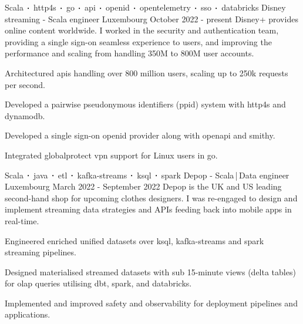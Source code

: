 
\newcommand*{\logo}[2]{\raisebox{-0.2em}{\texttt{[image: \#2]}}\hspace{0.25em}#1}
\newcommand*{\logoonly}[1]{\raisebox{-0.2em}{\texttt{[image: \#1]}}}

\begin{cventries}
    \cventry
    {Scala$\sqbig$http4s$\sqbig$go$\sqbig$api$\sqbig$openid$\sqbig$opentelemetry$\sqbig$sso$\sqbig$databricks}
    {\logo{Disney streaming}{../../../images/disney.png} - Scala engineer}
    {Luxembourg}
    {October 2022 - present}
    {Disney+ provides online content worldwide. I worked in the security and authentication team, providing a single sign-on seamless experience to users, and improving the performance and scaling from handling 350M to 800M user accounts.}
    {
        \begin{cvitems}
            \item{Architectured apis handling over 800 million users, scaling up to 250k requests per second.}
            \item{Developed a pairwise pseudonymous identifiers (ppid) system with http4s and dynamodb.}
            \item{Developed a single sign-on openid provider along with openapi and smithy.}
            \item{Integrated globalprotect vpn support for Linux users in go.}
        \end{cvitems}
    }

    \cventry
    {Scala$\sqbig$java$\sqbig$etl$\sqbig$kafka-streams$\sqbig$ksql$\sqbig$spark}
    {\logo{Depop}{../../../images/depop.jpg} - Scala\,|\,Data engineer}
    {Luxembourg}
    {March 2022 - September 2022}
    {Depop is the UK and US leading second-hand shop for upcoming clothes designers. I was re-engaged to design and implement streaming data strategies and APIs feeding back into mobile apps in real-time.}
    {
        \begin{cvitems}
            \item{Engineered enriched unified datasets over ksql, kafka-streams and spark streaming pipelines.}
            \item{Designed materialised streamed datasets with sub 15-minute views (delta tables) for olap queries utilising dbt, spark, and databricks.}
            \item{Implemented and improved safety and observability for deployment pipelines and applications.}
        \end{cvitems}
    }


\end{cventries}
